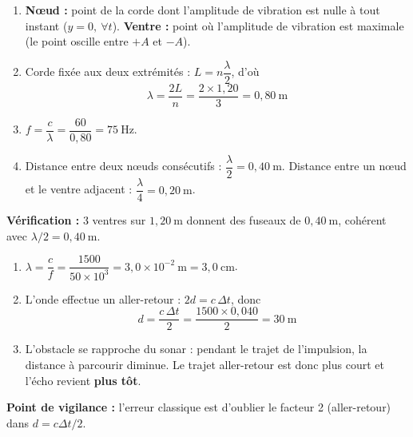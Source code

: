\documentclass[11pt]{article}
\begin{document}
\begin{corrige}
\begin{enumerate}
    \item \textbf{Nœud :} point de la corde dont l'amplitude de vibration est nulle à tout instant ($y = 0,\ \forall t$). \textbf{Ventre :} point où l'amplitude de vibration est maximale (le point oscille entre $+A$ et $-A$).
    \item Corde fixée aux deux extrémités : $L = n\dfrac{\lambda}{2}$, d'où
    \[
    \lambda = \frac{2L}{n} = \frac{2 \times 1{,}20}{3} = 0{,}80\ \text{m}
    \]
    \item $f = \dfrac{c}{\lambda} = \dfrac{60}{0{,}80} = 75\ \text{Hz}$.
    \item Distance entre deux nœuds consécutifs : $\dfrac{\lambda}{2} = 0{,}40\ \text{m}$. Distance entre un nœud et le ventre adjacent : $\dfrac{\lambda}{4} = 0{,}20\ \text{m}$.
\end{enumerate}
\textbf{Vérification :} 3 ventres sur $1{,}20\ \text{m}$ donnent des fuseaux de $0{,}40\ \text{m}$, cohérent avec $\lambda/2 = 0{,}40\ \text{m}$.
\end{corrige}

\begin{corrige}
\begin{enumerate}
    \item $\lambda = \dfrac{c}{f} = \dfrac{1500}{50 \times 10^{3}} = 3{,}0 \times 10^{-2}\ \text{m} = 3{,}0\ \text{cm}$.
    \item L'onde effectue un aller-retour : $2d = c\,\Delta t$, donc
    \[
    d = \frac{c\,\Delta t}{2} = \frac{1500 \times 0{,}040}{2} = 30\ \text{m}
    \]
    \item L'obstacle se rapproche du sonar : pendant le trajet de l'impulsion, la distance à parcourir diminue. Le trajet aller-retour est donc plus court et l'écho revient \textbf{plus tôt}.
\end{enumerate}
\textbf{Point de vigilance :} l'erreur classique est d'oublier le facteur 2 (aller-retour) dans $d = c\Delta t/2$.
\end{corrige}
\end{document}
